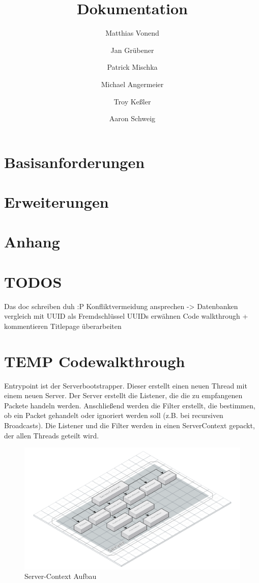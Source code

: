 \documentclass[a4paper]{article}
\title{Dokumentation}
\author{
    Matthias Vonend
    \and
    Jan Grübener
    \and
    Patrick Mischka
    \and
    Michael Angermeier
    \and
    Troy Keßler
    \and
    Aaron Schweig
    \and
}
\theoremstyle{definition}
\begin{document}
    \maketitle
    \tableofcontents

    \vspace{0.2cm}


    \section{Basisanforderungen}
        
    \section{Erweiterungen}
        
    \clearpage
    \section{Anhang}


    \section{TODOS}
        Das doc schreiben duh :P
        Konfliktvermeidung ansprechen -> Datenbanken vergleich mit UUID als Fremdschlüssel
        UUIDs erwähnen
        Code walkthrough + kommentieren
        Titlepage überarbeiten



    \section{TEMP Codewalkthrough}
    Entrypoint ist der Serverbootstrapper. Dieser erstellt einen neuen Thread mit einem neuen Server. Der Server erstellt die Listener, die die zu empfangenen Packete handeln werden. Anschließend werden die Filter erstellt, die bestimmen, ob ein Packet gehandelt oder ignoriert werden soll (z.B. bei recursiven Broadcasts). Die Listener und die Filter werden in einen ServerContext gepackt, der allen Threads geteilt wird.

    \begin{figure}[h]
        \centering
        \includegraphics[width=\textwidth]{VS-Server-Context.png}
        
        \caption{Server-Context Aufbau}
        \label{}
    \end{figure}
\end{document}
